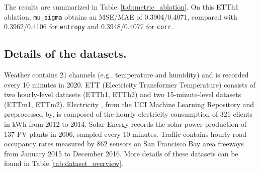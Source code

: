 \documentclass[sigconf,anonymous,review]{acmart}
\begin{document}
The results are summarized in Table~\ref{tab:metric_ablation}. On this ETTh1
ablation, \texttt{mu\_sigma} obtains an MSE/MAE of 0.3904/0.4071, compared
with 0.3962/0.4106 for \texttt{entropy} and 0.3948/0.4077 for
\texttt{corr}.

\begin{table}[h]
    \centering
    \caption{Comparison of different stationarity metrics on ETTh1 with iTransformer. \textit{mu\_sigma} denotes our default unsupervised metric; \textit{entropy} focuses on intra-sample distribution; \textit{corr} utilizes future labels to approximate Mutual Information.}
    \label{tab:metric_ablation}
\end{table}



\subsection{Details of the datasets.}
\label{appendix:exp_datasets}
Weather contains 21 channels (e.g., temperature and humidity) and is recorded every 10 minutes in 2020. 
ETT \citep{Informer} (Electricity Transformer Temperature) consists of two hourly-level datasets (ETTh1, ETTh2) and two 15-minute-level datasets (ETTm1, ETTm2). 
Electricity \citep{long_and_short_SiGIR18}, from the UCI Machine Learning Repository and preprocessed by, is composed of the hourly electricity consumption of 321 clients in kWh from 2012 to 2014. 
Solar-Energy \citep{long_and_short_SiGIR18} records the solar power production of 137 PV plants in 2006, sampled every 10 minutes.
Trafﬁc contains hourly road occupancy rates measured by 862 sensors on San Francisco Bay area freeways from January 2015 to December 2016.
More details of these datasets can be found in Table.\ref{tab:dataset_overview}.
\end{document}
